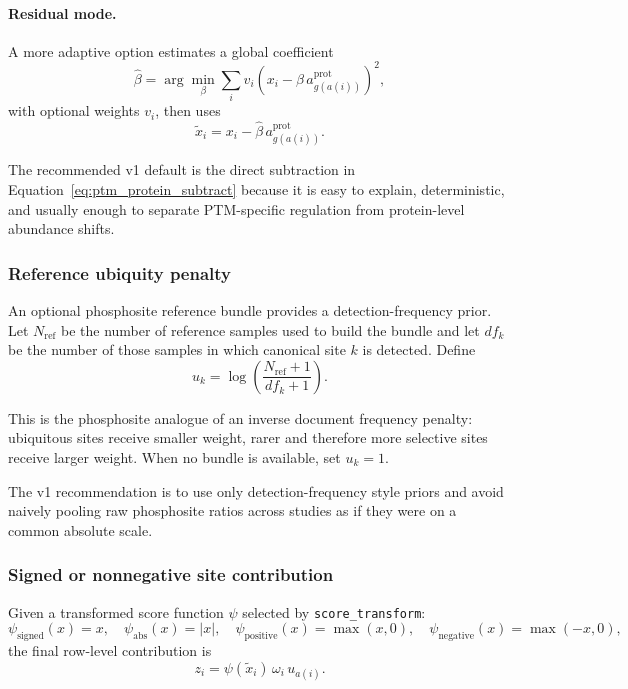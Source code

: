 \documentclass[11pt]{article}
\begin{document}
\paragraph{Residual mode.}
A more adaptive option estimates a global coefficient
\[
\widehat{\beta} = \arg\min_{\beta} \sum_i v_i
\left(x_i - \beta \, a_{g(a(i))}^{\mathrm{prot}}\right)^2,
\]
with optional weights $v_i$, then uses
\[
\widetilde{x}_i = x_i - \widehat{\beta} \,
a_{g(a(i))}^{\mathrm{prot}}.
\]

The recommended v1 default is the direct subtraction in
Equation~\eqref{eq:ptm_protein_subtract} because it is easy to explain,
deterministic, and usually enough to separate PTM-specific regulation from
protein-level abundance shifts.

\subsubsection{Reference ubiquity penalty}
An optional phosphosite reference bundle provides a detection-frequency prior.
Let $N_{\mathrm{ref}}$ be the number of reference samples used to build the
bundle and let $df_k$ be the number of those samples in which canonical site $k$
is detected. Define
\begin{equation}
u_k = \log \left( \frac{N_{\mathrm{ref}} + 1}{df_k + 1} \right).
\label{eq:ptm_idf}
\end{equation}

This is the phosphosite analogue of an inverse document frequency penalty:
ubiquitous sites receive smaller weight, rarer and therefore more selective
sites receive larger weight. When no bundle is available, set $u_k = 1$.

The v1 recommendation is to use only detection-frequency style priors and avoid
naively pooling raw phosphosite ratios across studies as if they were on a
common absolute scale.

\subsubsection{Signed or nonnegative site contribution}
Given a transformed score function $\psi$ selected by
\texttt{score\_transform}:
\[
\psi_{\mathrm{signed}}(x)=x,\quad
\psi_{\mathrm{abs}}(x)=|x|,\quad
\psi_{\mathrm{positive}}(x)=\max(x,0),\quad
\psi_{\mathrm{negative}}(x)=\max(-x,0),
\]
the final row-level contribution is
\begin{equation}
z_i = \psi(\widetilde{x}_i)\, \omega_i \, u_{a(i)}.
\label{eq:ptm_row_score}
\end{equation}
\end{document}
